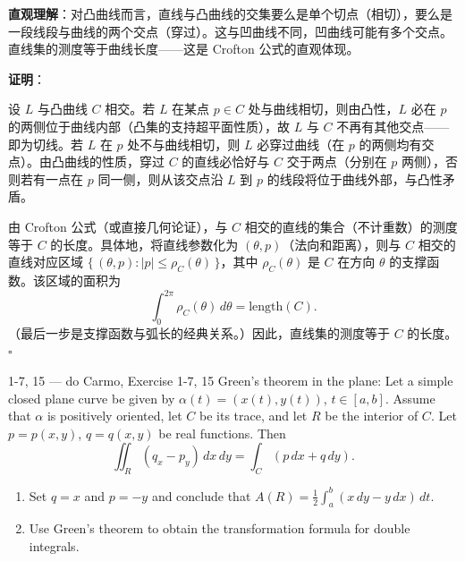 \begin{solution}
\textbf{直观理解}：对凸曲线而言，直线与凸曲线的交集要么是单个切点（相切），要么是一段线段与曲线的两个交点（穿过）。这与凹曲线不同，凹曲线可能有多个交点。直线集的测度等于曲线长度——这是 Crofton 公式的直观体现。

\textbf{证明}：
\item[a.] 设 $L$ 与凸曲线 $C$ 相交。若 $L$ 在某点 $p \in C$ 处与曲线相切，则由凸性，$L$ 必在 $p$ 的两侧位于曲线内部（凸集的支持超平面性质），故 $L$ 与 $C$ 不再有其他交点——即为切线。若 $L$ 在 $p$ 处不与曲线相切，则 $L$ 必穿过曲线（在 $p$ 的两侧均有交点）。由凸曲线的性质，穿过 $C$ 的直线必恰好与 $C$ 交于两点（分别在 $p$ 两侧），否则若有一点在 $p$ 同一侧，则从该交点沿 $L$ 到 $p$ 的线段将位于曲线外部，与凸性矛盾。

\item[b.] 由 Crofton 公式（或直接几何论证），与 $C$ 相交的直线的集合（不计重数）的测度等于 $C$ 的长度。具体地，将直线参数化为 $(\theta, p)$（法向和距离），则与 $C$ 相交的直线对应区域 $\{\,(\theta, p) : |p| \leq \rho_C(\theta)\,\}$，其中 $\rho_C(\theta)$ 是 $C$ 在方向 $\theta$ 的支撑函数。该区域的面积为
\[
\int_0^{2\pi} \rho_C(\theta) \, d\theta = \text{length}(C).
\]
（最后一步是支撑函数与弧长的经典关系。）因此，直线集的测度等于 $C$ 的长度。$\square$
\end{solution}

\begin{exercise}{1-7, 15 — do Carmo, Exercise 1-7, 15}
Green's theorem in the plane: Let a simple closed plane curve be given by $\alpha(t) = (x(t), y(t))$, $t \in [a, b]$. Assume that $\alpha$ is positively oriented, let $C$ be its trace, and let $R$ be the interior of $C$. Let $p = p(x, y)$, $q = q(x, y)$ be real functions. Then
\[
\iint_R (q_x - p_y) \, dx \, dy = \int_C (p \, dx + q \, dy).
\]
\begin{enumerate}
\item[a.] Set $q = x$ and $p = -y$ and conclude that $A(R) = \frac{1}{2} \int_a^b (x \, dy - y \, dx) \, dt$.
\item[b.] Use Green's theorem to obtain the transformation formula for double integrals.
\end{enumerate}
\end{exercise}

